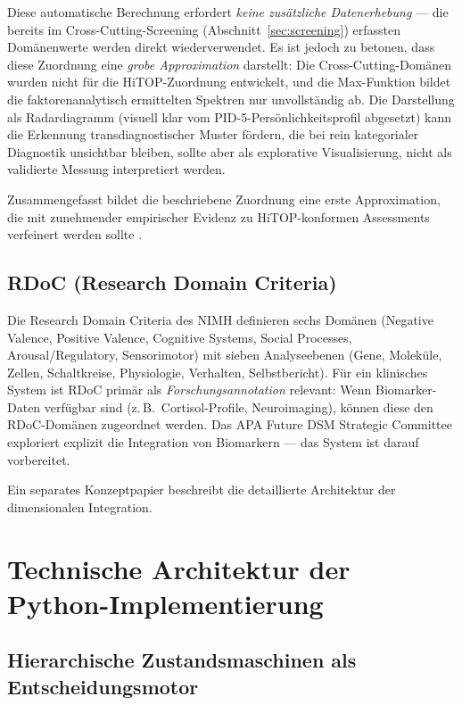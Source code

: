 \documentclass[11pt,a4paper]{article}
\begin{document}
Diese automatische Berechnung erfordert \textit{keine zus\"atzliche Datenerhebung} --- die bereits im Cross-Cutting-Screening (Abschnitt~\ref{sec:screening}) erfassten Dom\"anenwerte werden direkt wiederverwendet. Es ist jedoch zu betonen, dass diese Zuordnung eine \textit{grobe Approximation} darstellt: Die Cross-Cutting-Dom\"anen wurden nicht f\"ur die HiTOP-Zuordnung entwickelt, und die Max-Funktion bildet die faktorenanalytisch ermittelten Spektren nur unvollst\"andig ab. Die Darstellung als Radardiagramm (visuell klar vom PID-5-Pers\"onlichkeitsprofil abgesetzt) kann die Erkennung transdiagnostischer Muster f\"ordern, die bei rein kategorialer Diagnostik unsichtbar bleiben, sollte aber als explorative Visualisierung, nicht als validierte Messung interpretiert werden.

Zusammengefasst bildet die beschriebene Zuordnung eine erste Approximation, die mit zunehmender empirischer Evidenz zu HiTOP-konformen Assessments verfeinert werden sollte \citep{Kotov2021}.

\subsection{RDoC (Research Domain Criteria)}

Die Research Domain Criteria des NIMH \citep{Insel2010} definieren sechs Dom\"anen (Negative Valence, Positive Valence, Cognitive Systems, Social Processes, Arousal/Regulatory, Sensorimotor) mit sieben Analyseebenen (Gene, Molek\"ule, Zellen, Schaltkreise, Physiologie, Verhalten, Selbstbericht). F\"ur ein klinisches System ist RDoC prim\"ar als \textit{Forschungsannotation} relevant: Wenn Biomarker-Daten verf\"ugbar sind (z.\,B.\ Cortisol-Profile, Neuroimaging), k\"onnen diese den RDoC-Dom\"anen zugeordnet werden. Das APA Future DSM Strategic Committee exploriert explizit die Integration von Biomarkern --- das System ist darauf vorbereitet.

Ein separates Konzeptpapier beschreibt die detaillierte Architektur der dimensionalen Integration.


\section{Technische Architektur der Python-Implementierung}
\label{sec:technik}

\subsection{Hierarchische Zustandsmaschinen als Entscheidungsmotor}
\end{document}
